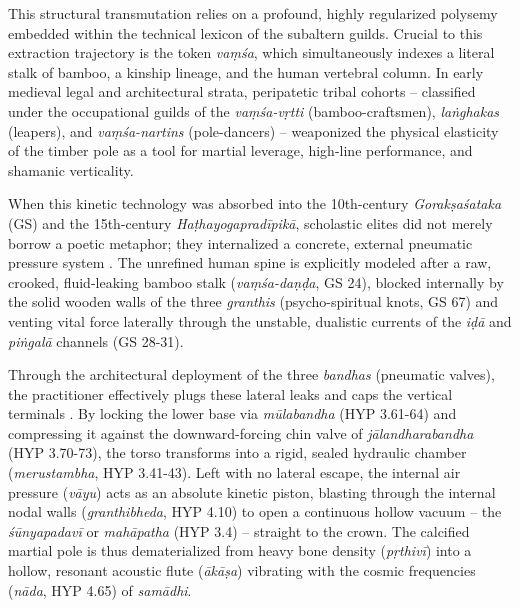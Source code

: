 \documentclass[11pt,twoside,letterpaper]{article}
\begin{document}
This structural transmutation relies on a profound, highly regularized polysemy embedded within the technical lexicon of the subaltern guilds. Crucial to this extraction trajectory is the token \textit{vaṃśa}, which simultaneously indexes a literal stalk of bamboo, a kinship lineage, and the human vertebral column. In early medieval legal and architectural strata, peripatetic tribal cohorts -- classified under the occupational guilds of the \textit{vaṃśa-vṛtti} (bamboo-craftsmen), \textit{la\.{n}ghakas} (leapers), and \textit{vaṃśa-nartins} (pole-dancers) -- weaponized the physical elasticity of the timber pole as a tool for martial leverage, high-line performance, and shamanic verticality. 

When this kinetic technology was absorbed into the 10th-century \textit{Gorakṣaśataka} (GS) and the 15th-century \textit{Haṭhayogapradīpikā}, scholastic elites did not merely borrow a poetic metaphor; they internalized a concrete, external pneumatic pressure system \citep{Mallinson2020, Swatmarama2024}. The unrefined human spine is explicitly modeled after a raw, crooked, fluid-leaking bamboo stalk (\textit{vaṃśa-daṇḍa}, GS 24), blocked internally by the solid wooden walls of the three \textit{granthis} (psycho-spiritual knots, GS 67) and venting vital force laterally through the unstable, dualistic currents of the \textit{iḍā} and \textit{piṅgalā} channels (GS 28-31).

Through the architectural deployment of the three \textit{bandhas} (pneumatic valves), the practitioner effectively plugs these lateral leaks and caps the vertical terminals \citep{Swatmarama2024}. By locking the lower base via \textit{mūlabandha} (HYP 3.61-64) and compressing it against the downward-forcing chin valve of \textit{jālandharabandha} (HYP 3.70-73), the torso transforms into a rigid, sealed hydraulic chamber (\textit{merustambha}, HYP 3.41-43). Left with no lateral escape, the internal air pressure (\textit{vāyu}) acts as an absolute kinetic piston, blasting through the internal nodal walls (\textit{granthibheda}, HYP 4.10) to open a continuous hollow vacuum -- the \textit{śūnyapadavī} or \textit{mahāpatha} (HYP 3.4) -- straight to the crown. The calcified martial pole is thus dematerialized from heavy bone density (\textit{pṛthivī}) into a hollow, resonant acoustic flute (\textit{ākāṣa}) vibrating with the cosmic frequencies (\textit{nāda}, HYP 4.65) of \textit{samādhi}.
\end{document}
